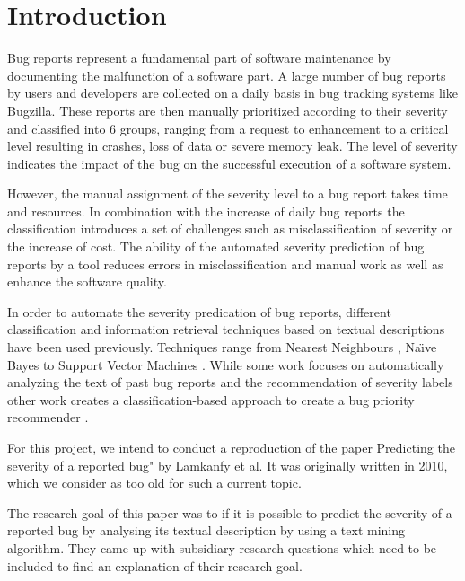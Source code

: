 \documentclass[sigconf,screen]{acmart}
\begin{document}
\section{Introduction}
Bug reports represent a fundamental part of software maintenance by documenting the malfunction of a software part. A large number of bug reports by users and developers are collected on a daily basis in bug tracking systems like Bugzilla. These reports are then manually prioritized according to their severity and classified into 6 groups, ranging from a request to enhancement to a critical level resulting in crashes, loss of data or severe memory leak. The level of severity indicates the impact of the bug on the successful execution of a software system.

However, the manual assignment of the severity level to a bug report takes time and resources. In combination with the increase of daily bug reports the classification introduces a set of challenges such as misclassification of severity or the increase of cost. The ability of the automated severity prediction of bug reports by a tool reduces errors in misclassification and manual work as well as enhance the software quality.

In order to automate the severity predication of bug reports, different classification and information retrieval techniques based on textual descriptions have been used previously. Techniques range from Nearest Neighbours \cite{TianDrone} \cite{LamkanfiMiningAlgo} \cite{ChaturvediBugSeverity}, Na{\"\i}ve Bayes \cite{LamkanfiMiningAlgo} \cite{ChaturvediBugSeverity} to Support Vector Machines \cite{KanwalOMSVM} \cite{LamkanfiMiningAlgo} \cite{ChaturvediBugSeverity}. While some work focuses on automatically analyzing the text of past bug reports and the recommendation of severity labels \cite{TianDrone} \cite{LamkanfiMiningAlgo} \cite{ChaturvediBugSeverity} other work creates a classification-based approach to create a bug priority recommender \cite{KanwalOMSVM}.

For this project, we intend to conduct a reproduction of the paper Predicting the severity of a reported bug" \cite{ourPaper} by Lamkanfy et al. It was originally written in 2010, which we consider as too old for such a current topic. 

The research goal of this paper was to if it is possible to predict the severity of a reported bug by analysing its textual description by using a text mining algorithm. They came up with subsidiary research questions which need to be included to find an explanation of their research goal.
\end{document}
